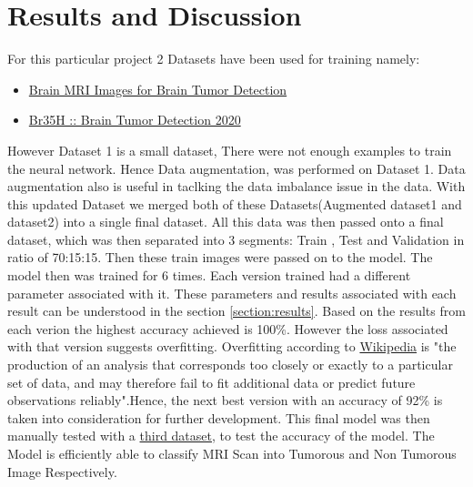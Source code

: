 \chapter{Results and Discussion}
For this particular project 2 Datasets have been used for training namely: 
\begin{itemize}
    \item \href{https://www.kaggle.com/navoneel/brain-mri-images-for-brain-tumor-detection}{Brain MRI Images for Brain Tumor Detection}
    \item \href{https://www.kaggle.com/ahmedhamada0/brain-tumor-detection}{Br35H :: Brain Tumor Detection 2020}
\end{itemize}
However Dataset 1 is a small dataset, There were not enough examples to train the neural network. Hence Data augmentation, was performed on Dataset 1. Data augmentation also is useful in taclking the data imbalance issue in the data. With this updated Dataset we merged both of these Datasets(Augmented dataset1 and dataset2) into a single final dataset. All this data was then passed onto a final dataset, which was then separated into 3 segments: Train , Test and Validation in ratio of 70:15:15. Then these train images were passed on to the model. The model then was trained for 6 times. Each version trained had a different parameter associated with it. These parameters and results associated with each result can be understood in the section \ref{section:results}.
Based on the results from each verion the highest accuracy achieved is 100\%. However the loss associated with that version suggests overfitting. Overfitting according to \href{https://en.wikipedia.org/wiki/Overfitting}{Wikipedia} is "the production of an analysis that corresponds too closely or exactly to a particular set of data, and may therefore fail to fit additional data or predict future observations reliably".Hence, the next best version with an accuracy of 92\% is taken into consideration for further development. This final model was then manually tested with a \href{https://www.kaggle.com/preetviradiya/brian-tumor-dataset}{third dataset}, to test the accuracy of the model. The Model is efficiently able to classify MRI Scan into Tumorous and Non Tumorous Image Respectively.

